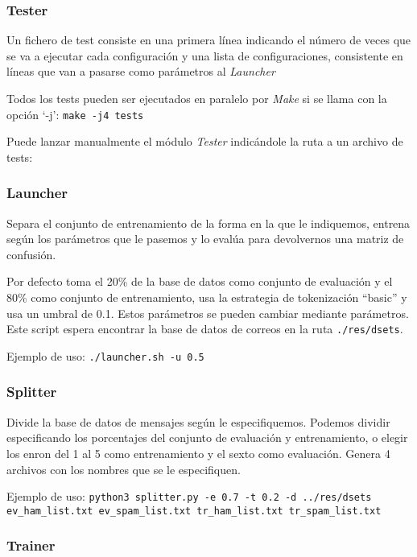 \subsubsection{Tester}

Un fichero de test consiste en una primera línea indicando el número de veces
que se va a ejecutar cada configuración y una lista de configuraciones,
consistente en líneas que van a pasarse como parámetros al \textit{Launcher}

Todos los tests pueden ser ejecutados en paralelo por \textit{Make} si se llama
con la opción `-j': \texttt{make -j4 tests}

Puede lanzar manualmente el módulo \textit{Tester} indicándole la ruta a un
archivo de tests\helpfn:

\subsubsection{Launcher}

Separa el conjunto de entrenamiento de la forma en la que le indiquemos, entrena
según los parámetros que le pasemos y lo evalúa para devolvernos una matriz de
confusión.

Por defecto toma el 20\% de la base de datos como conjunto de evaluación y el
80\% como conjunto de entrenamiento, usa la estrategia de tokenización ``basic''
y usa un umbral de 0.1. Estos parámetros se pueden cambiar mediante
parámetros\helpfn. Este script espera encontrar la base de datos de correos en
la ruta \texttt{./res/dsets}.

Ejemplo de uso: \texttt{./launcher.sh -u 0.5}

\subsubsection{Splitter}

Divide la base de datos de mensajes según le especifiquemos. Podemos dividir
especificando los porcentajes del conjunto de evaluación y entrenamiento, o
elegir los enron del 1 al 5 como entrenamiento y el sexto como
evaluación\helpfn. Genera 4 archivos con los nombres que se le especifiquen.

Ejemplo de uso: \texttt{python3 splitter.py -e 0.7 -t 0.2 -d ../res/dsets ev\_ham\_list.txt ev\_spam\_list.txt tr\_ham\_list.txt tr\_spam\_list.txt}

\subsubsection{Trainer}


